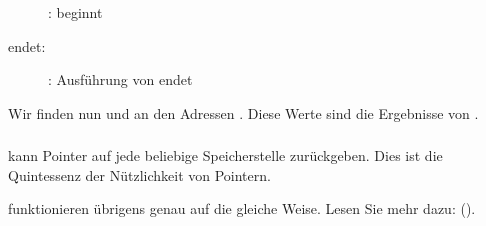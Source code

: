 \begin{figure}[H]
\centering
{}
\caption{\olly: \ttfone beginnt}
\label{fig:pointers_olly_stk_2}
\end{figure}

\clearpage
\ttfone endet:

\begin{figure}[H]
\centering
{}
\caption{\olly: Ausführung von \ttfone endet}
\label{fig:pointers_olly_stk_3}
\end{figure}
Wir finden nun  und  an den Adressen \PtrsAddresses.
Diese Werte sind die Ergebnisse von \ttfone.

\subsubsection{\Conclusion{}}
\ttfone kann Pointer auf jede beliebige Speicherstelle zurückgeben.
Dies ist die Quintessenz der Nützlichkeit von Pointern. 
 
\Cpp {} funktionieren übrigens genau auf die gleiche Weise. Lesen Sie mehr dazu: ().
